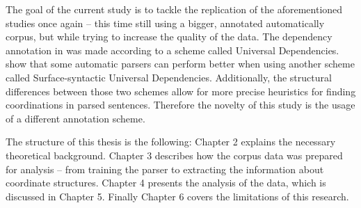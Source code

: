 The goal of the current study is to tackle the replication of the aforementioned studies once again -- this time still using a bigger, annotated automatically corpus, but while trying to increase the quality of the data. The dependency annotation in \cite{pbg2023} was made according to a scheme called Universal Dependencies. \cite{tuo:prz:lac:21} show that some automatic parsers can perform better when using another scheme called Surface-syntactic Universal Dependencies. Additionally, the structural differences between those two schemes allow for more precise heuristics for finding coordinations in parsed sentences. Therefore the novelty of this study is the usage of a different annotation scheme. 

The structure of this thesis is the following: Chapter 2 explains the necessary theoretical background. Chapter 3 describes how the corpus data was prepared for analysis -- from training the parser to extracting the information about coordinate structures. Chapter 4 presents the analysis of the data, which is discussed in Chapter 5. Finally Chapter 6 covers the limitations of this research. 